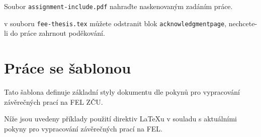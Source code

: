 Soubor \texttt{assignment-include.pdf} nahraďte naskenovaným zadáním práce.

\bigskip

\begin{note}
  v souboru \texttt{fee-thesis.tex} můžete odstranit blok \texttt{acknowledgmentpage}, nechcete-li do práce zahrnout poděkování.
\end{note}

\chapter{Práce se šablonou}

Tato šablona definuje základní styly dokumentu dle pokynů pro vypracování závěrečných prací na FEL ZČU.

Níže jsou uvedeny příklady použití direktiv \LaTeX{}u v souladu s aktuálními pokyny pro vypracování závěrečných prací na FEL. 

%

